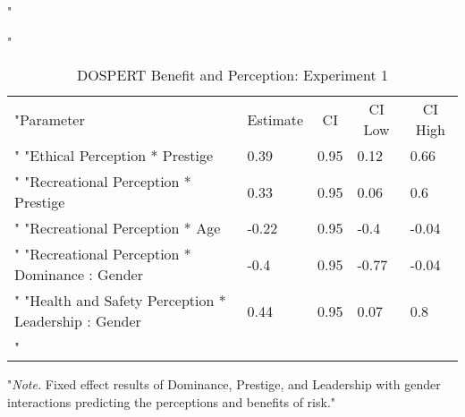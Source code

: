 \documentclass[
"  donotrepeattitle,doc, 12pt, a4paper,floatsintext]{apa7}"
\begin{document}
\begin{table}[h]
\begin{center}
\begin{threeparttable}
"\caption{\label{tab:m4_perceivedRisk_Gender_exp_1}DOSPERT Benefit and Perception: Experiment 1}"
\begin{tabular}{lllll}
\toprule
"Parameter & \multicolumn{1}{c}{Estimate} & \multicolumn{1}{c}{CI} & \multicolumn{1}{c}{CI Low} & \multicolumn{1}{c}{CI High}\\"
\midrule
"Ethical Perception * Prestige & 0.39 & 0.95 & 0.12 & 0.66\\"
"Recreational Perception * Prestige & 0.33 & 0.95 & 0.06 & 0.6\\"
"Recreational Perception * Age & -0.22 & 0.95 & -0.4 & -0.04\\"
"Recreational Perception * Dominance : Gender & -0.4 & 0.95 & -0.77 & -0.04\\"
"Health and Safety Perception * Leadership : Gender & 0.44 & 0.95 & 0.07 & 0.8\\"
\bottomrule
\addlinespace
\end{tabular}
\begin{tablenotes}[para]
"\normalsize{\textit{Note.} Fixed effect results of Dominance, Prestige, and Leadership with gender interactions predicting the perceptions and benefits of risk.}"
\end{tablenotes}
\end{threeparttable}
\end{center}
\end{table}
\end{document}
